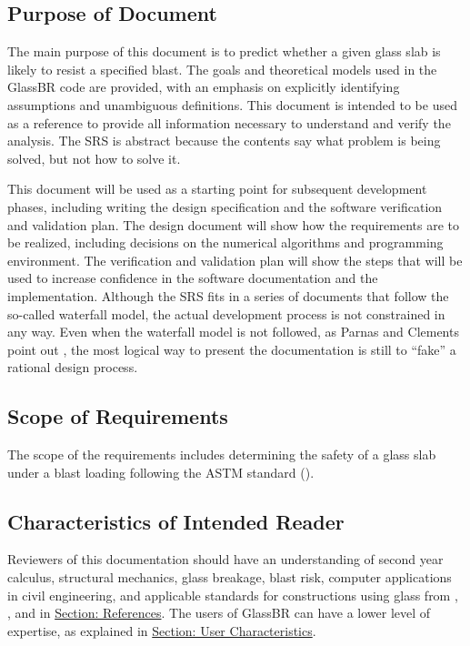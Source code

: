 \documentclass[12pt]{article}
\begin{document}
\subsection{Purpose of Document}
\label{Sec:DocPurpose}
The main purpose of this document is to predict whether a given glass slab is likely to resist a specified blast. The goals and theoretical models used in the GlassBR code are provided, with an emphasis on explicitly identifying assumptions and unambiguous definitions. This document is intended to be used as a reference to provide all information necessary to understand and verify the analysis. The SRS is abstract because the contents say what problem is being solved, but not how to solve it.

This document will be used as a starting point for subsequent development phases, including writing the design specification and the software verification and validation plan. The design document will show how the requirements are to be realized, including decisions on the numerical algorithms and programming environment. The verification and validation plan will show the steps that will be used to increase confidence in the software documentation and the implementation. Although the SRS fits in a series of documents that follow the so-called waterfall model, the actual development process is not constrained in any way. Even when the waterfall model is not followed, as Parnas and Clements point out \cite{parnasClements1986}, the most logical way to present the documentation is still to ``fake'' a rational design process.

\subsection{Scope of Requirements}
\label{Sec:ReqsScope}
The scope of the requirements includes determining the safety of a glass slab under a blast loading following the ASTM standard (\cite{astm2009}).

\subsection{Characteristics of Intended Reader}
\label{Sec:ReaderChars}
Reviewers of this documentation should have an understanding of second year calculus, structural mechanics, glass breakage, blast risk, computer applications in civil engineering, and applicable standards for constructions using glass from \cite{astm2009}, \cite{astm2012}, and \cite{astm2016} in \hyperref[Sec:References]{Section: References}. The users of GlassBR can have a lower level of expertise, as explained in \hyperref[Sec:UserChars]{Section: User Characteristics}.
\end{document}
